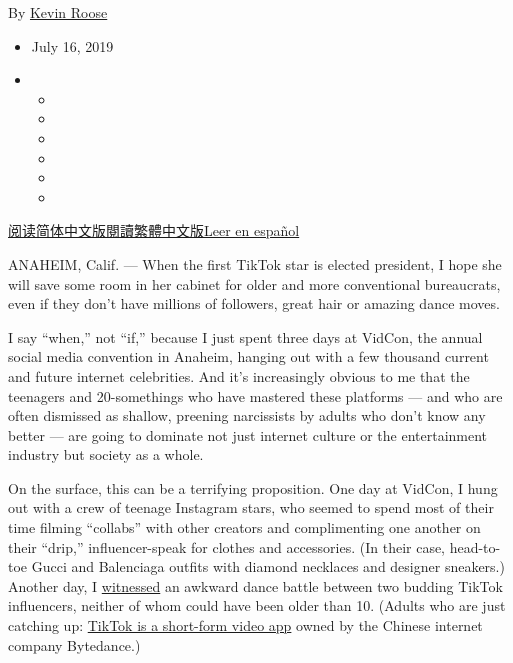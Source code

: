 By \href{https://www.nytimes.com/by/kevin-roose}{Kevin Roose}

\begin{itemize}
\item
  July 16, 2019
\item
  \begin{itemize}
  \item
  \item
  \item
  \item
  \item
  \item
  \end{itemize}
\end{itemize}

\href{https://cn.nytimes.com/technology/20190718/vidcon-social-media-influencers/}{阅读简体中文版}\href{https://cn.nytimes.com/technology/20190718/vidcon-social-media-influencers/zh-hant/}{閱讀繁體中文版}\href{https://www.nytimes.com/es/2019/07/19/influencers-influentes-youtubers-instagram}{Leer
en español}

ANAHEIM, Calif. --- When the first TikTok star is elected president, I
hope she will save some room in her cabinet for older and more
conventional bureaucrats, even if they don't have millions of followers,
great hair or amazing dance moves.

I say ``when,'' not ``if,'' because I just spent three days at VidCon,
the annual social media convention in Anaheim, hanging out with a few
thousand current and future internet celebrities. And it's increasingly
obvious to me that the teenagers and 20-somethings who have mastered
these platforms --- and who are often dismissed as shallow, preening
narcissists by adults who don't know any better --- are going to
dominate not just internet culture or the entertainment industry but
society as a whole.

On the surface, this can be a terrifying proposition. One day at VidCon,
I hung out with a crew of teenage Instagram stars, who seemed to spend
most of their time filming ``collabs'' with other creators and
complimenting one another on their ``drip,'' influencer-speak for
clothes and accessories. (In their case, head-to-toe Gucci and
Balenciaga outfits with diamond necklaces and designer sneakers.)
Another day, I
\href{https://twitter.com/kevinroose/status/1149852860022050817}{witnessed}
an awkward dance battle between two budding TikTok influencers, neither
of whom could have been older than 10. (Adults who are just catching up:
\href{https://www.nytimes.com/2019/03/10/style/what-is-tik-tok.html}{TikTok
is a short-form video app} owned by the Chinese internet company
Bytedance.)

